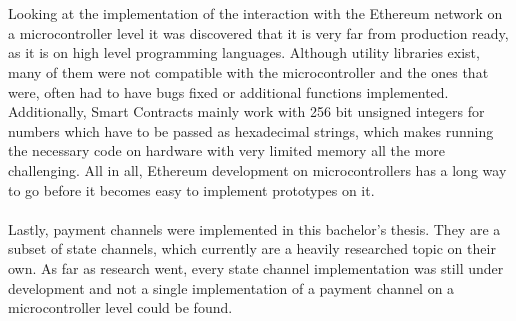 \\\\
Looking at the implementation of the interaction with the Ethereum network on a microcontroller level it was discovered that it is very far from production ready, as it is on high level programming languages. Although utility libraries exist, many of them were not compatible with the microcontroller and the ones that were, often had to have bugs fixed or additional functions implemented. Additionally, Smart Contracts mainly work with 256 bit unsigned integers for numbers which have to be passed as hexadecimal strings, which makes running the necessary code on hardware with very limited memory all the more challenging. All in all, Ethereum development on microcontrollers has a long way to go before it becomes easy to implement prototypes on it.
\\\\
Lastly, payment channels were implemented in this bachelor’s thesis. They are a subset of state channels, which currently are a heavily researched topic on their own\cite{state-channels}. As far as research went, every state channel implementation was still under development and not a single implementation of a payment channel on a microcontroller level could be found.